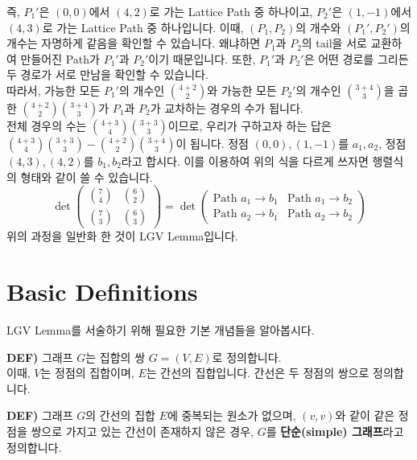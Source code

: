 \documentclass[a4paper]{article}
\begin{document}
즉, $P_1'$은 $(0, 0)$에서 $(4,2)$로 가는 Lattice Path 중 하나이고, $P_2'$은 $(1, -1)$에서 $(4,3)$로 가는 Lattice Path 중 하나입니다. 이때, $(P_1, P_2)$의 개수와 $(P_1', P_2')$의 개수는 자명하게 같음을 확인할 수 있습니다. 왜냐하면 $P_1$과 $P_2$의 tail을 서로 교환하여 만들어진 Path가 $P_1'$과 $P_2'$이기 때문입니다. 또한, $P_1'$과 $P_2'$은 어떤 경로를 그리든 두 경로가 서로 만남을 확인할 수 있습니다.\\
따라서, 가능한 모든 $P_1'$의 개수인 $\binom{4+2}{2}$와 가능한 모든 $P_2'$의 개수인 $\binom{3+4}{3}$을 곱한 $\binom{4+2}{2}\binom{3+4}{3}$가 $P_1$과 $P_2$가 교차하는 경우의 수가 됩니다.\\
전체 경우의 수는 $\binom{4+3}{4}\binom{3+3}{3}$이므로, 우리가 구하고자 하는 답은 $\binom{4+3}{4}\binom{3+3}{3} - \binom{4+2}{2}\binom{3+4}{3}$이 됩니다. 정점 $(0,0), (1, -1)$를 $a_1, a_2$, 정점 $(4,3), (4,2)$를 $b_1, b_2$라고 합시다. 이를 이용하여 위의 식을 다르게 쓰자면 행렬식의 형태와 같이 쓸 수 있습니다.$$\det \begin{pmatrix} \displaystyle \binom{7}{4} & \displaystyle \binom{6}{2}\\[0.3cm] \displaystyle \binom{7}{3} & \displaystyle \binom{6}{3} \end{pmatrix} = \det \begin{pmatrix}
    \textrm{Path }a_1\rightarrow b_1 & \textrm{Path }a_1\rightarrow b_2 \\
    \textrm{Path }a_2\rightarrow b_1& \textrm{Path }a_2\rightarrow b_2
\end{pmatrix}$$
위의 과정을 일반화 한 것이 LGV Lemma입니다.

\newpage
\section{Basic Definitions}
LGV Lemma를 서술하기 위해 필요한 기본 개념들을 알아봅시다.

\begin{mdframed}
\textbf{DEF)} 그래프 $G$는 집합의 쌍 $G = (V,E)$로 정의합니다.\\
이때, $V$는 정점의 집합이며, $E$는 간선의 집합입니다. 간선은 두 정점의 쌍으로 정의합니다.
\end{mdframed}

\begin{mdframed}
\textbf{DEF)} 그래프 $G$의 간선의 집합 $E$에 중복되는 원소가 없으며, $(v, v)$와 같이 같은 정점을 쌍으로 가지고 있는 간선이 존재하지 않은 경우, $G$를 \textbf{단순(simple) 그래프}라고 정의합니다.
\end{mdframed}
\end{document}
